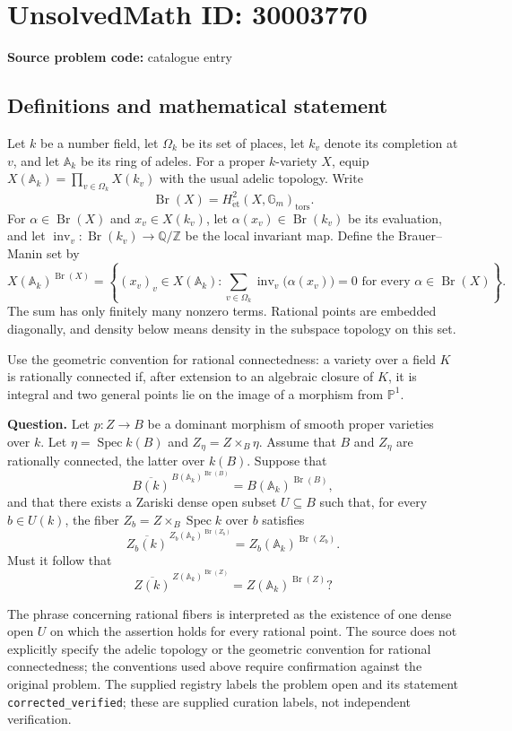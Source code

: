 \documentclass[11pt]{article}
\newcommand{\Z}{\mathbb{Z}}
\newcommand{\Q}{\mathbb{Q}}
\newcommand{\PP}{\mathbb{P}}
\begin{document}
\section*{UnsolvedMath ID: 30003770}
\textbf{Source problem code:} catalogue entry
\subsection{Definitions and mathematical statement}
Let \(k\) be a number field, let \(\Omega_k\) be its set of places, let \(k_v\) denote its completion at \(v\), and let \(\mathbb A_k\) be its ring of adeles. For a proper \(k\)-variety \(X\), equip \(X(\mathbb A_k)=\prod_{v\in\Omega_k}X(k_v)\) with the usual adelic topology. Write
\[
\operatorname{Br}(X)=H^2_{\mathrm{\acute et}}(X,\mathbb G_m)_{\mathrm{tors}}.
\]
For \(\alpha\in\operatorname{Br}(X)\) and \(x_v\in X(k_v)\), let \(\alpha(x_v)\in\operatorname{Br}(k_v)\) be its evaluation, and let \(\operatorname{inv}_v:\operatorname{Br}(k_v)\to\Q/\Z\) be the local invariant map. Define the Brauer--Manin set by
\[
X(\mathbb A_k)^{\operatorname{Br}(X)}
=
\left\{(x_v)_v\in X(\mathbb A_k):
\sum_{v\in\Omega_k}\operatorname{inv}_v\bigl(\alpha(x_v)\bigr)=0
\text{ for every }\alpha\in\operatorname{Br}(X)\right\}.
\]
The sum has only finitely many nonzero terms. Rational points are embedded diagonally, and density below means density in the subspace topology on this set.

Use the geometric convention for rational connectedness: a variety over a field \(K\) is rationally connected if, after extension to an algebraic closure of \(K\), it is integral and two general points lie on the image of a morphism from \(\PP^1\).

\textbf{Question.} Let \(p:Z\to B\) be a dominant morphism of smooth proper varieties over \(k\). Let \(\eta=\operatorname{Spec}k(B)\) and \(Z_\eta=Z\times_B\eta\). Assume that \(B\) and \(Z_\eta\) are rationally connected, the latter over \(k(B)\). Suppose that
\[
\overline{B(k)}^{\,B(\mathbb A_k)^{\operatorname{Br}(B)}}
=B(\mathbb A_k)^{\operatorname{Br}(B)},
\]
and that there exists a Zariski dense open subset \(U\subseteq B\) such that, for every \(b\in U(k)\), the fiber \(Z_b=Z\times_B\operatorname{Spec}k\) over \(b\) satisfies
\[
\overline{Z_b(k)}^{\,Z_b(\mathbb A_k)^{\operatorname{Br}(Z_b)}}
=Z_b(\mathbb A_k)^{\operatorname{Br}(Z_b)}.
\]
Must it follow that
\[
\overline{Z(k)}^{\,Z(\mathbb A_k)^{\operatorname{Br}(Z)}}
=Z(\mathbb A_k)^{\operatorname{Br}(Z)}?
\]

The phrase concerning rational fibers is interpreted as the existence of one dense open \(U\) on which the assertion holds for every rational point. The source does not explicitly specify the adelic topology or the geometric convention for rational connectedness; the conventions used above require confirmation against the original problem. The supplied registry labels the problem open and its statement \texttt{corrected\_verified}; these are supplied curation labels, not independent verification.
\end{document}
